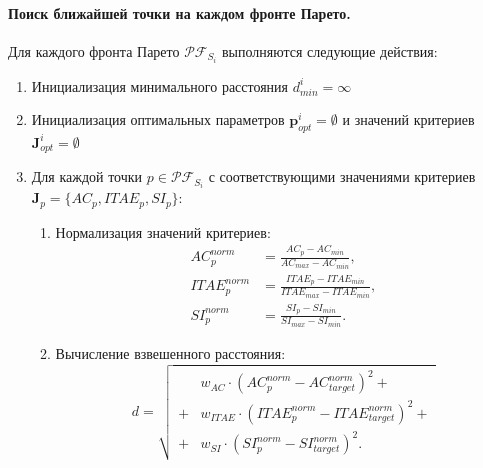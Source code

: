 \paragraph*{Поиск ближайшей точки на каждом фронте Парето.}

Для каждого фронта Парето $\mathcal{PF}_{S_i}$ выполняются следующие действия:

\begin{enumerate}
    \item Инициализация минимального расстояния $d_{min}^i = \infty$
    \item Инициализация оптимальных параметров $\mathbf{p}_{opt}^i = \emptyset$ и значений критериев $\mathbf{J}_{opt}^i = \emptyset$

    \item Для каждой точки $p \in \mathcal{PF}_{S_i}$ с соответствующими значениями критериев $\mathbf{J}_p = \{AC_p, ITAE_p, SI_p\}$:
          \begin{enumerate}
              \item Нормализация значений критериев:
                    \begin{equation*}
                        \begin{aligned}
                            AC_p^{norm}   & = \frac{AC_p - AC_{min}}{AC_{max} - AC_{min}}     ,    \\
                            ITAE_p^{norm} & = \frac{ITAE_p - ITAE_{min}}{ITAE_{max} - ITAE_{min}} ,\\
                            SI_p^{norm}   & = \frac{SI_p - SI_{min}}{SI_{max} - SI_{min}}.
                        \end{aligned}
                    \end{equation*}

              \item Вычисление взвешенного расстояния:
                    \begin{equation*}
                        d = \sqrt{
                            \begin{aligned}
                                  & w_{AC} \cdot (AC_p^{norm} - AC_{target}^{norm})^2 +       \\
                                + & w_{ITAE} \cdot (ITAE_p^{norm} - ITAE_{target}^{norm})^2 + \\
                                + & w_{SI} \cdot (SI_p^{norm} - SI_{target}^{norm})^2.
                            \end{aligned}
                        }
                    \end{equation*}


\end{enumerate}
\end{enumerate}
